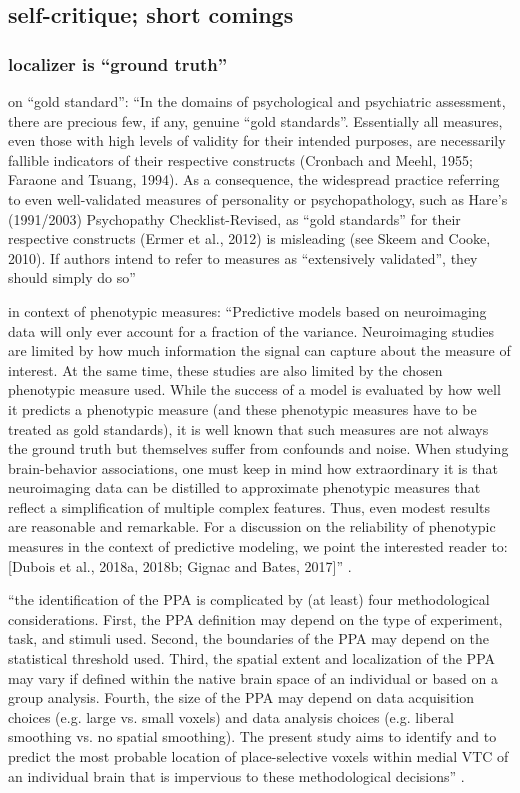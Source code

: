 {\subsection{self-critique; short comings}


\subsubsection{localizer is ``ground truth''}

\citet{lilienfeld2015fifty} on ``gold standard'': ``In the domains of
psychological and psychiatric assessment, there are precious few, if any,
genuine ``gold standards''. Essentially all measures, even those with high
levels of validity for their intended purposes, are necessarily fallible
indicators of their respective constructs (Cronbach and Meehl, 1955; Faraone and
Tsuang, 1994). As a consequence, the widespread practice referring to even
well-validated measures of personality or psychopathology, such as Hare’s
(1991/2003) Psychopathy Checklist-Revised, as ``gold standards'' for their
respective constructs (Ermer et al., 2012) is misleading (see Skeem and Cooke,
2010). If authors intend to refer to measures as ``extensively validated'', they
should simply do so'' \citep{lilienfeld2015fifty}

\citet{scheinost2019ten} in context of phenotypic measures: ``Predictive models
based on neuroimaging data will only ever account for a fraction of the
variance. Neuroimaging studies are limited by how much information the signal
can capture about the measure of interest. At the same time, these studies are
also limited by the chosen phenotypic measure used.  While the success of a
model is evaluated by how well it predicts a phenotypic measure (and these
phenotypic measures have to be treated as gold standards), it is well known that
such measures are not always the ground truth but themselves suffer from
confounds and noise.  When studying brain-behavior associations, one must keep
in mind how extraordinary it is that neuroimaging data can be distilled to
approximate phenotypic measures that reflect a simplification of multiple
complex features. Thus, even modest results are reasonable and remarkable. For
a discussion on the reliability of phenotypic measures in the context of
predictive modeling, we point the interested reader to: [Dubois et al., 2018a,
2018b; Gignac and Bates, 2017]'' \citep{scheinost2019ten}.

``the identiﬁcation of the PPA is complicated by (at least) four
methodological considerations. First, the PPA deﬁnition may depend on the type
of experiment, task, and stimuli used. Second, the boundaries of the PPA may
depend on the statistical threshold used. Third, the spatial extent and
localization of the PPA may vary if deﬁned within the native brain space of an
individual or based on a group analysis. Fourth, the size of the PPA may depend
on data acquisition choices (e.g. large vs. small voxels) and data analysis
choices (e.g. liberal smoothing vs. no spatial smoothing). The present study
aims to identify and to predict the most probable location of place-selective
voxels within medial VTC of an individual brain that is impervious to these
methodological decisions'' \citep{weiner2018defining}.


}
